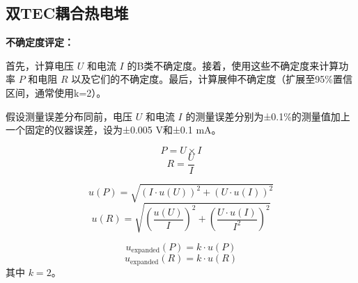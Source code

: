 \documentclass[dvipsnames, svgnames,a4paper,11pt]{article}
\begin{document}
    
\clearpage

    \subsection{双TEC耦合热电堆}

        \textbf{不确定度评定：}
        
        首先，计算电压 \( U \) 和电流 \( I \) 的B类不确定度。接着，使用这些不确定度来计算功率 \( P \) 和电阻 \( R \) 以及它们的不确定度。最后，计算展伸不确定度（扩展至95\%置信区间，通常使用k=2）。

        假设测量误差分布同前，电压 \( U \) 和电流 \( I \) 的测量误差分别为±0.1\%的测量值加上一个固定的仪器误差，设为±0.005 V和±0.1 mA。

        \[ P = U \times I \]
        \[ R = \frac{U}{I} \]

        \[ u(P) = \sqrt{(I \cdot u(U))^2 + (U \cdot u(I))^2} \]
        \[ u(R) = \sqrt{\left(\frac{u(U)}{I}\right)^2 + \left(\frac{U \cdot u(I)}{I^2}\right)^2} \]

        \[ u_{\text{expanded}}(P) = k \cdot u(P) \]
        \[ u_{\text{expanded}}(R) = k \cdot u(R) \]
        其中 \( k = 2 \)。
\end{document}
